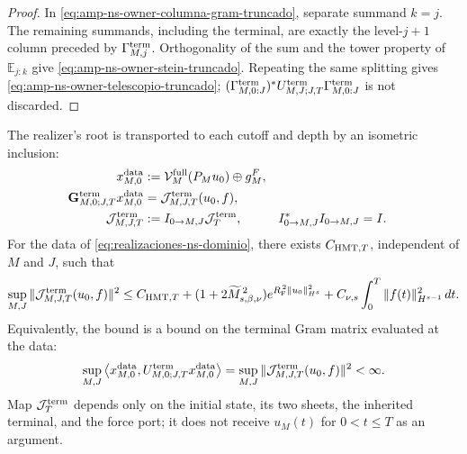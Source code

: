 \begin{proof}
In \eqref{eq:amp-ns-owner-columna-gram-truncado}, separate summand \(k=j\). The remaining summands, including the terminal, are exactly the level-\(j+1\) column preceded by \(\Gamma_{M,j}^{\rm term}\). Orthogonality of the sum and the tower property of \(\mathbb E_{j:k}\) give \eqref{eq:amp-ns-owner-stein-truncado}. Repeating the same splitting gives \eqref{eq:amp-ns-owner-telescopio-truncado}; \((\Gamma_{M,0:J}^{\rm term})^*U_{M,J;J,T}^{\rm term}
\Gamma_{M,0:J}^{\rm term}\) is not discarded.
\end{proof}

\begin{theorem}
\label{thm:amp-ns-inyeccion-raiz-uniforme}
The realizer's root is transported to each cutoff and depth by an isometric inclusion:
\begin{equation}\label{eq:amp-ns-inyeccion-raiz-comun}
 \begin{aligned}
 x_{M,0}^{\rm data}
 &:=\mathcal V_M^{\rm full}(P_Mu_0)\oplus g_M^F,\\
 \mathbf G_{M,0;J,T}^{\rm term}x_{M,0}^{\rm data}
 &=\mathcal J_{M,J,T}^{\rm term}(u_0,f),\\
 \mathcal J_{M,J,T}^{\rm term}
 &:=I_{0\to M,J}\mathcal J_T^{\rm term},
 & I_{0\to M,J}^*I_{0\to M,J}&=I.
 \end{aligned}
\end{equation}
For the data of \eqref{eq:realizaciones-ns-dominio}, there exists \(C_{{\rm HMT},T}\), independent of \(M\) and \(J\), such that
\begin{equation}\label{eq:amp-ns-inyeccion-raiz-cota}
 \sup_{M,J}
 \|\mathcal J_{M,J,T}^{\rm term}(u_0,f)\|^2
 \leq C_{{\rm HMT},T}
 +(1+2\widetilde M_{s,\beta,\nu}^{\,2})
  e^{R_{\rm F}^{\,2}\|u_0\|_{H^s}^2}
 +C_{\nu,s}\int_0^T\|f(t)\|_{H^{s-1}}^2\,dt .
\end{equation}
Equivalently, the bound is a bound on the terminal Gram matrix evaluated at the data:
\begin{equation}\label{eq:amp-ns-owner-gram-cota-uniforme}
 \sup_{M,J}
 \left\langle x_{M,0}^{\rm data},
 U_{M,0;J,T}^{\rm term}x_{M,0}^{\rm data}\right\rangle
 =
 \sup_{M,J}
 \|\mathcal J_{M,J,T}^{\rm term}(u_0,f)\|^2
 <\infty .
\end{equation}
Map \(\mathcal J_T^{\rm term}\) depends only on the initial state, its two sheets, the inherited terminal, and the force port; it does not receive \(u_M(t)\) for \(0<t\leq T\) as an argument.
\end{theorem}


